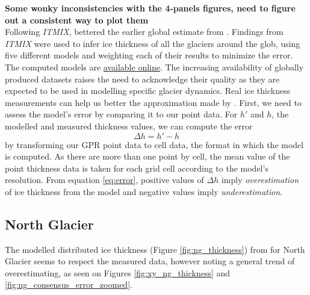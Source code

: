 \documentclass[a4, 12pt]{article}
\newcommand{\fref}[1]{(Figure \ref{#1})}
\begin{document}
\textbf{Some wonky inconsistencies with the 4-panels figures, need to figure out a consistent way to plot them}
\\
Following \textit{ITMIX}, \citet{farinotti2019consensus} bettered the earlier global estimate from \citeauthor{huss2012distributed} \citeyear{huss2012distributed}. Findings from \textit{ITMIX} were used to infer ice thickness of all the glaciers around the glob, using five different models and weighting each of their results to minimize the error. The computed models are \href{https://www.research-collection.ethz.ch/handle/20.500.11850/315707}{available online}. The increasing availability of globally produced datasets raises the need to acknowledge their quality as they are expected to be used in modelling specific glacier dynamics.
Real ice thickness measurements can help us better the approximation made by \citet{farinotti2019consensus}. First, we need to assess the model's error by comparing it to our point data.
For $h'$ and $h$, the modelled and measured thickness values, we can compute the error 
\begin{equation}
\Delta h = h' - h
\label{eq:error}
\end{equation} by transforming our GPR point data to cell data, the format in which the model is computed. As there are more than one point by cell, the mean value of the point thickness data is taken for each grid cell according to the model's resolution. From equation \ref{eq:error}, positive values of $\Delta h$ imply \textit{overestimation} of ice thickness from the model and negative values imply \textit{underestimation}.

\subsection{North Glacier}
The modelled distributed ice thickness \fref{fig:ng_thickness} from \citet{farinotti2019consensus} for North Glacier seems to respect the measured data, however noting a general trend of overestimating, as seen on Figures \ref{fig:xy_ng_thickness} and \ref{fig:ng_consensus_error_zoomed}.
\end{document}

